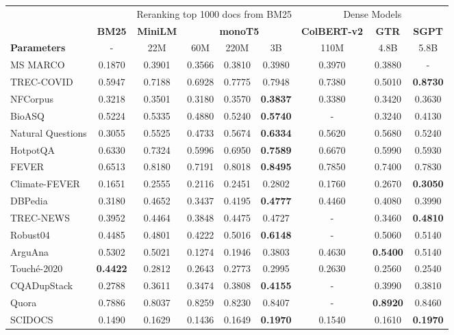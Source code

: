 \documentclass[sigconf,nonacm]{acmart}
\begin{document}
\begin{table*}[]
\centering \begin{tabular}{lc|cccc|ccc}
\toprule
 & & \multicolumn{4}{c|}{Reranking top 1000 docs from BM25} & \multicolumn{3}{c}{Dense Models}\\
 & \textbf{BM25} & \textbf{MiniLM} & \multicolumn{3}{c|}{\textbf{monoT5}} & \textbf{ColBERT-v2} & \textbf{GTR} & \textbf{SGPT}   \\
\textbf{Parameters} & - & 22M & 60M & 220M & 3B & 110M & 4.8B & 5.8B \\
\midrule
MS MARCO & 0.1870 & 0.3901 
& 0.3566 & 0.3810 & 0.3980 & 0.3970 & 0.3880 & -   \\ 
\midrule
TREC-COVID & 0.5947 & 0.7188 & 0.6928 &  0.7775 & 0.7948 & 0.7380 & 0.5010 & \textbf{0.8730}  \\
NFCorpus & 0.3218 & 0.3501 & 0.3180 & 0.3570 & \textbf{0.3837} & 0.3380 & 0.3420 & 0.3630 \\  
BioASQ & 0.5224 & 0.5335 & 0.4880 & 0.5240 & \textbf{0.5740} & - & 0.3240 & 0.4130  \\
Natural Questions & 0.3055 & 0.5525 
& 0.4733 & 0.5674 & \textbf{0.6334} & 0.5620 & 0.5680 & 0.5240 \\
HotpotQA & 0.6330 & 0.7324 
& 0.5996 & 0.6950 & \textbf{0.7589} & 0.6670 & 0.5990 & 0.5930 \\
FEVER & 0.6513 & 0.8180 
& 0.7191 & 0.8018 & \textbf{0.8495} & 0.7850 & 0.7400 & 0.7830 \\
Climate-FEVER & 0.1651 & 0.2555 & 0.2116 & 0.2451 & 0.2802 & 0.1760 & 0.2670 & \textbf{0.3050} \\
DBPedia & 0.3180 & 0.4652 
& 0.3437 & 0.4195 & \textbf{0.4777} & 0.4460 & 0.4080 & 0.3990  \\
TREC-NEWS & 0.3952 & 0.4464 
& 0.3848 & 0.4475 & 0.4727 & - & 0.3460 & \textbf{0.4810} \\
Robust04 & 0.4485 & 0.4801 
& 0.4222 & 0.5016 & \textbf{0.6148} & - & 0.5060 & 0.5140 \\
ArguAna & 0.5302 & 0.5021 
& 0.1274 & 0.1946 & 0.3803 & 0.4630 & \textbf{0.5400} & 0.5140 \\
Touché-2020 & \textbf{0.4422} & 0.2812 & 0.2643 & 0.2773 & 0.2995 & 0.2630 & 0.2560 & 0.2540 \\
CQADupStack & 0.2788 & 0.3611 & 0.3474 & 0.3808 & \textbf{0.4155} & - & 0.3990 & 0.3810 \\
Quora & 0.7886 & 0.8037 & 0.8259 & 0.8230 & 0.8407 & - & \textbf{0.8920} & 0.8460 \\
SCIDOCS & 0.1490 & 0.1629 
& 0.1436 & 0.1649 & \textbf{0.1970} & 0.1540 & 0.1610 & \textbf{0.1970}  \\

\end{tabular}
\end{table*}
\end{document}
